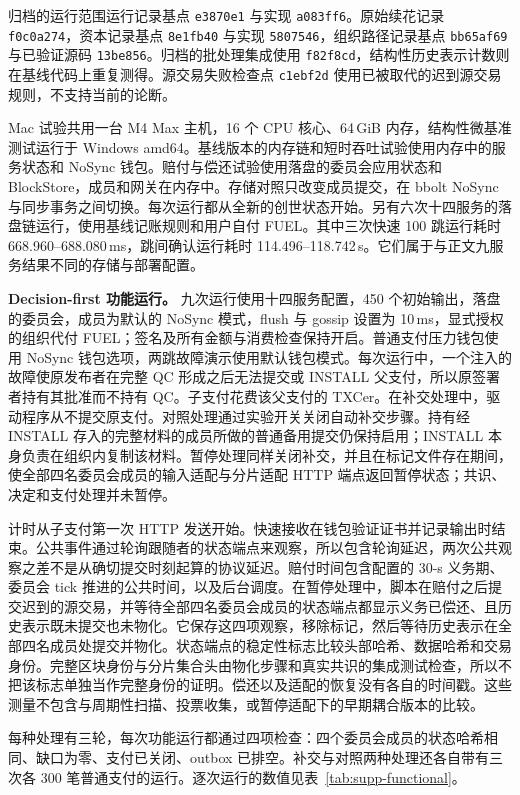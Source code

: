 归档的运行范围运行记录基点 \texttt{e3870e1} 与实现 \texttt{a083ff6}。原始续花记录 \texttt{f0c0a274}，资本记录基点 \texttt{8e1fb40} 与实现 \texttt{5807546}，组织路径记录基点 \texttt{bb65af69} 与已验证源码 \texttt{13be856}。归档的批处理集成使用 \texttt{f82f8cd}，结构性历史表示计数则在基线代码上重复测得。源交易失败检查点 \texttt{c1ebf2d} 使用已被取代的迟到源交易规则，不支持当前的论断。

Mac 试验共用一台 M4 Max 主机，16 个 CPU 核心、64\,GiB 内存，结构性微基准测试运行于 Windows amd64。基线版本的内存链和短时吞吐试验使用内存中的服务状态和 NoSync 钱包。赔付与偿还试验使用落盘的委员会应用状态和 BlockStore，成员和网关在内存中。存储对照只改变成员提交，在 bbolt NoSync 与同步事务之间切换。每次运行都从全新的创世状态开始。另有六次十四服务的落盘链运行，使用基线记账规则和用户自付 FUEL。其中三次快速 100 跳运行耗时 668.960--688.080\,ms，跳间确认运行耗时 114.496--118.742\,s。它们属于与正文九服务结果不同的存储与部署配置。

\noindent\textbf{Decision-first 功能运行。}
九次运行使用十四服务配置，450 个初始输出，落盘的委员会，成员为默认的 NoSync 模式，flush 与 gossip 设置为 10\,ms，显式授权的组织代付 FUEL；签名及所有金额与消费检查保持开启。普通支付压力钱包使用 NoSync 钱包选项，两跳故障演示使用默认钱包模式。每次运行中，一个注入的故障使原发布者在完整 QC 形成之后无法提交或 INSTALL 父支付，所以原签署者持有其批准而不持有 QC。子支付花费该父支付的 TXCer。在补交处理中，驱动程序从不提交原支付。对照处理通过实验开关关闭自动补交步骤。持有经 INSTALL 存入的完整材料的成员所做的普通备用提交仍保持启用；INSTALL 本身负责在组织内复制该材料。暂停处理同样关闭补交，并且在标记文件存在期间，使全部四名委员会成员的输入适配与分片适配 HTTP 端点返回暂停状态；共识、决定和支付处理并未暂停。

计时从子支付第一次 HTTP 发送开始。快速接收在钱包验证证书并记录输出时结束。公共事件通过轮询跟随者的状态端点来观察，所以包含轮询延迟，两次公共观察之差不是从确切提交时刻起算的协议延迟。赔付时间包含配置的 30-s 义务期、委员会 tick 推进的公共时间，以及后台调度。在暂停处理中，脚本在赔付之后提交迟到的源交易，并等待全部四名委员会成员的状态端点都显示义务已偿还、且历史表示既未提交也未物化。它保存这四项观察，移除标记，然后等待历史表示在全部四名成员处提交并物化。状态端点的稳定性标志比较头部哈希、数据哈希和交易身份。完整区块身份与分片集合头由物化步骤和真实共识的集成测试检查，所以不把该标志单独当作完整身份的证明。偿还以及适配的恢复没有各自的时间戳。这些测量不包含与周期性扫描、投票收集，或暂停适配下的早期耦合版本的比较。

每种处理有三轮，每次功能运行都通过四项检查：四个委员会成员的状态哈希相同、缺口为零、支付已关闭、outbox 已排空。补交与对照两种处理还各自带有三次各 300 笔普通支付的运行。逐次运行的数值见表~\ref{tab:supp-functional}。


